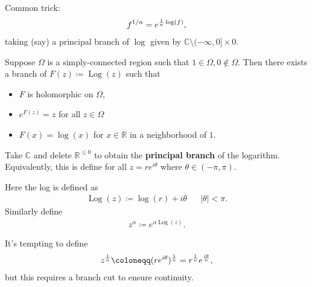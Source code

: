 \begin{fact}

Common trick:
\begin{align*}
f^{1/n} = e^{{1\over n} \log(f)}
,\end{align*}
taking (say) a principal branch of \(\log\) given by
\({\mathbb{C}}\setminus(-\infty, 0] \times 0\).

\end{fact}

\begin{proposition}

Suppose \(\Omega\) is a simply-connected region such that
\(1\in \Omega, 0\not\in\Omega\). Then there exists a branch of
\(F(z) \coloneqq\operatorname{Log}(z)\) such that

\begin{itemize}
\tightlist
\item
  \(F\) is holomorphic on \(\Omega\),
\item
  \(e^{F(z)} = z\) for all \(z\in \Omega\)
\item
  \(F(x) = \log(x)\) for \(x\in {\mathbb{R}}\) in a neighborhood of
  \(1\).
\end{itemize}

\end{proposition}

\begin{definition}

Take \({\mathbb{C}}\) and delete \({\mathbb{R}}^{\leq 0}\) to obtain the
\textbf{principal branch} of the logarithm. Equivalently, this is define
for all \(z=re^{i\theta}\) where \(\theta \in (-\pi, \pi)\).

Here the log is defined as
\begin{align*}
\operatorname{Log}(z) \coloneqq\log(r) + i\theta && {\left\lvert {\theta} \right\rvert} < \pi
.\end{align*}
Similarly define
\begin{align*}
z^{\alpha} \coloneqq e^{\alpha \operatorname{Log}(z)}
.\end{align*}

\end{definition}

\begin{warnings}

It's tempting to define
\begin{align*}
z^{1\over n} \coloneqq(re^{i\theta})^{1\over n} = r^{1\over n} e^{i\theta \over n}
,\end{align*}
but this requires a branch cut to ensure continuity.

\end{warnings}

